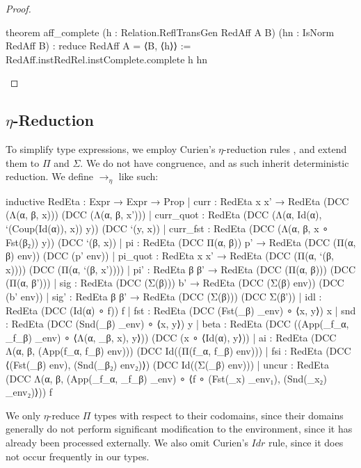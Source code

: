 \documentclass{article}
\newcommand{\etaarr}{\rightarrow_{\eta}}
\begin{document}
\begin{proof}
\begin{leancode}


theorem aff_complete (h : Relation.ReflTransGen RedAff A B)
  (hn : IsNorm RedAff B) : reduce RedAff A = ⟨B, ⟨h⟩⟩ :=
  RedAff.instRedRel.instComplete.complete h hn
\end{leancode}
\end{proof}

\subsection{\(\eta\)-Reduction}

To simplify type expressions, we employ Curien's \(\eta\)-reduction rules \autocite[p. 221]{CURIEN1986188}, and extend them to \(\Pi\) and \(\Sigma\). We do not have congruence, and as such inherit deterministic reduction. We define \(\etaarr\) like such:

\begin{leancode}
inductive RedEta : Expr → Expr → Prop
  | curr      : RedEta x x' → RedEta (DCC (Λ(α, β, x))) (DCC (Λ(α, β, x')))
  | curr_quot : RedEta (DCC (Λ(α, Id(α), `(Coup(Id(α)), x)) y)) (DCC `(y, x))
  | curr_fst  : RedEta (DCC (Λ(α, β, x ∘ Fst(β₂)) y)) (DCC `(β, x))
  | pi        : RedEta (DCC Π(α, β)) p' → RedEta (DCC (Π(α, β) env)) (DCC (p' env))
  | pi_quot   : RedEta x x' → RedEta (DCC (Π(α, `(β, x)))) (DCC (Π(α, `(β, x'))))
  | pi'       : RedEta β β' → RedEta (DCC (Π(α, β))) (DCC (Π(α, β')))
  | sig       : RedEta (DCC (Σ(β))) b' → RedEta (DCC (Σ(β) env)) (DCC (b' env))
  | sig'      : RedEta β β' → RedEta (DCC (Σ(β))) (DCC Σ(β'))
  | idl       : RedEta (DCC (Id(α) ∘ f)) f
  | fst       : RedEta (DCC (Fst(_β) _env) ∘ ⟨x, y⟩) x
  | snd       : RedEta (DCC (Snd(_β) _env) ∘ ⟨x, y⟩) y
  | beta      : RedEta
    (DCC ((App(_f_α, _f_β) _env) ∘ ⟨Λ(α, _β, x), y⟩))
    (DCC (x ∘ ⟨Id(α), y⟩))
  | ai        : RedEta (DCC Λ(α, β, (App(f_α, f_β) env))) (DCC Id((Π(f_α, f_β) env)))
  | fsi       : RedEta (DCC ⟨(Fst(_β) env), (Snd(_β₂) env₂)⟩) (DCC Id((Σ(_β) env)))
  | uncur     : RedEta (DCC Λ(α, β,
    (App(_f_α, _f_β) _env) ∘ ⟨f ∘ (Fst(_x) _env₁), (Snd(_x₂) _env₂)⟩)) f
\end{leancode}

We only \(\eta\)-reduce \(\Pi\) types with respect to their codomains, since their domains generally do not perform significant modification to the environment, since it has already been processed externally. We also omit Curien's \(Idr\) rule, since it does not occur frequently in our types.
\end{document}
